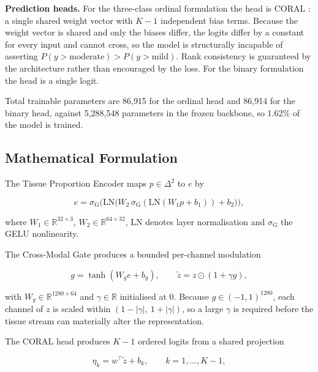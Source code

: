 \textbf{Prediction heads.} For the three-class ordinal formulation the head
is CORAL \cite{cao2020}: a single shared weight vector with $K-1$
independent bias terms. Because the weight vector is shared and only the
biases differ, the logits differ by a constant for every input and cannot
cross, so the model is structurally incapable of asserting
$P(y > \text{moderate}) > P(y > \text{mild})$. Rank consistency is
guaranteed by the architecture rather than encouraged by the loss. For the
binary formulation the head is a single logit.

Total trainable parameters are 86{,}915 for the ordinal head and 86{,}914
for the binary head, against 5{,}288{,}548 parameters in the frozen
backbone, so 1.62\% of the model is trained.

\subsection{Mathematical Formulation}

The Tissue Proportion Encoder maps $p \in \Delta^{2}$ to $e$ by

\begin{equation}
e = \sigma_{\text{G}}\Big(
    \mathrm{LN}\big(W_2\,
    \sigma_{\text{G}}(\mathrm{LN}(W_1 p + b_1))
    + b_2\big)\Big),
\label{eq:encoder}
\end{equation}

where $W_1 \in \mathbb{R}^{32 \times 3}$,
$W_2 \in \mathbb{R}^{64 \times 32}$, $\mathrm{LN}$ denotes layer
normalisation and $\sigma_{\text{G}}$ the GELU nonlinearity.

The Cross-Modal Gate produces a bounded per-channel modulation

\begin{equation}
g = \tanh(W_g e + b_g), \qquad
\tilde{z} = z \odot (1 + \gamma g),
\label{eq:gate}
\end{equation}

with $W_g \in \mathbb{R}^{1280 \times 64}$ and $\gamma \in \mathbb{R}$
initialised at $0$. Because $g \in (-1, 1)^{1280}$, each channel of $z$ is
scaled within $(1 - |\gamma|,\ 1 + |\gamma|)$, so a large $\gamma$ is
required before the tissue stream can materially alter the representation.

The CORAL head produces $K-1$ ordered logits from a shared projection

\begin{equation}
\eta_k = w^{\top} \tilde{z} + b_k, \qquad k = 1, \dots, K-1,
\label{eq:coral}
\end{equation}

